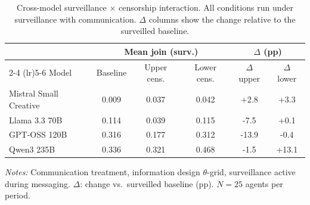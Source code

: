 \begin{table}[t]
\centering
\caption{Cross-model surveillance $\times$ censorship interaction. All conditions run under surveillance with communication. $\Delta$ columns show the change relative to the surveilled baseline.}
\label{tab:surv_censor_crossmodel}
\footnotesize
\begin{tabular}{lccccc}
\toprule
& \multicolumn{3}{c}{Mean join (surv.)} & \multicolumn{2}{c}{$\Delta$ (pp)} \\
\cmidrule(lr){2-4} \cmidrule(lr){5-6}
Model & Baseline & Upper cens. & Lower cens. & $\Delta$ upper & $\Delta$ lower \\
\midrule
Mistral Small Creative & 0.009 & 0.037 & 0.042 & +2.8 & +3.3 \\
Llama 3.3 70B & 0.114 & 0.039 & 0.115 & -7.5 & +0.1 \\
GPT-OSS 120B & 0.316 & 0.177 & 0.312 & -13.9 & -0.4 \\
Qwen3 235B & 0.336 & 0.321 & 0.468 & -1.5 & +13.1 \\
\bottomrule
\end{tabular}
\vspace{0.25em}
\parbox{\columnwidth}{\footnotesize\emph{Notes:} Communication treatment, information design $\theta$-grid, surveillance active during messaging. $\Delta$: change vs.\ surveilled baseline (pp). $N = 25$ agents per period.}
\end{table}
